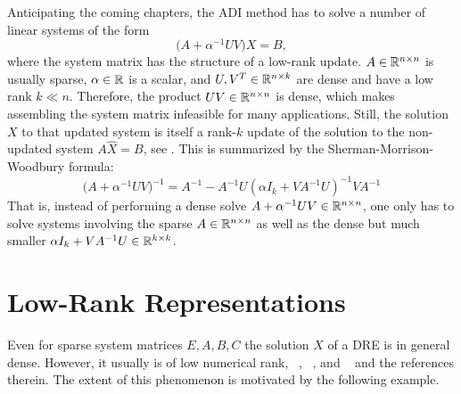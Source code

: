 Anticipating the coming chapters,
the \ac{ADI} method has to solve a number of linear systems of the form
\begin{equation}
  \big(A + \alpha^{-1} UV \big) X = B
  ,
\end{equation}
where the system matrix has the structure of a low-rank update.
$A\in\mathbb{R}^{n\times n}$ is usually sparse,
$\alpha\in\mathbb{R}$ is a scalar,
and $U, V^T \in\mathbb{R}^{n\times k}$ are dense and have a low rank $k\ll n$.
Therefore, the product $UV \in\mathbb{R}^{n\times n}$ is dense,
which makes assembling the system matrix infeasible for many applications.
Still, the solution $X$ to that updated system is itself a rank-$k$ update of the solution to the non-updated system $A \hat X = B$,
see \eg \cite{Strang2016, Golub2013}.
This is summarized by the Sherman-Morrison-Woodbury formula:
\begin{equation}
  \big( A + \alpha^{-1}UV \big)^{-1} =
  A^{-1} - A^{-1} U (\alpha I_k + V A^{-1} U)^{-1} V A^{-1}
\end{equation}
That is, instead of performing a dense solve \wrt $A + \alpha^{-1} UV \in\mathbb{R}^{n\times n}$,
one only has to solve systems involving the sparse $A \in \mathbb{R}^{n\times n}$
as well as the dense but much smaller $\alpha I_k + VA^{-1} U \in\mathbb{R}^{k\times k}$.

\section{Low-Rank Representations}
\label{sec:lowrank}

Even for sparse system matrices $E, A, B, C$
the solution $X$ of a \ac{DRE} is in general dense.
However, it usually is of low numerical rank,
\cf \eg \citeauthor{Penzl2000}~\cite{Penzl2000},
\citeauthor{Lang2017}~\cite[Section~2.1.4]{Lang2017},
and \citeauthor{Kuerschner2016}~\cite[Sections~2.3.3 and~2.3.4]{Kuerschner2016}
and the references therein.
The extent of this phenomenon
is motivated by the following example.

